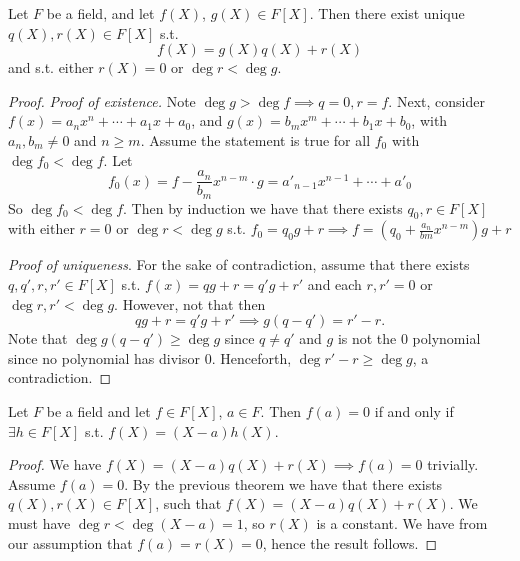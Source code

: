 \begin{theorem}
  Let $F$ be a field, and let $f(X)$, $g(X)\in F[X]$. Then there exist unique $q(X),
  r(X)\in F[X]$ s.t. 
  \[f(X)=g(X)q(X)+r(X)\]
  and s.t. either $r(X)=0$ or $\deg r < \deg g$.
  \label{thm:divisionReminderPolynomial}
\end{theorem}
\begin{proof}
  \emph{Proof of existence.} Note $\deg g> \deg f \implies q=0, r=f$. Next, consider
  $f(x)=a_nx^n+\cdots+a_1x+a_0$, and $g(x)=b_mx^m+\cdots+b_1x+b_0$, with $a_n,b_m\neq 0$
  and $n\geq m$. Assume the statement is true for all $f_0$ with $\deg f_0<\deg f$. Let 
  \[f_0(x)=f-\frac{a_n}{b_m}x^{n-m}\cdot g = a'_{n-1}x^{n-1}+\cdots+a'_0\]
  So $\deg f_0< \deg f$. Then by induction we have that there exists $q_0, r\in F[X]$ with
  either $r=0$ or $\deg r< \deg g$ s.t.  $f_0=q_0g + r \implies f=
  (q_0+\frac{a_n}{bm}x^{n-m})g + r$

  \emph{Proof of uniqueness}. For the sake of contradiction, assume that there exists
  $q,q',r,r'\in F[X]$ s.t. $f(x)=qg+r=q'g+r'$ and each $r,r'=0$ or $\deg r,r'<\deg g$.
  However, not that then 
  \[qg+r=q'g+r' \implies g(q-q')=r'-r.\]
  Note that $\deg g(q-q')\geq \deg g$ since $q\neq q'$ and $g$ is not the $0$ polynomial
  since no polynomial has divisor $0$. Henceforth, $\deg r'-r\geq \deg g$, a
  contradiction.
\end{proof}

\begin{corollary}
  Let $F$ be a field and let $f\in F[X]$, $a\in F$. Then $f(a)=0$ if and only if $\exists
  h\in F[X]$ s.t. $f(X)=(X-a)h(X)$.
  \label{<+label+>}
\end{corollary}
\begin{proof}
  We have $f(X) = (X-a)q(X)+r(X) \implies f(a)=0$ trivially. 
  Assume $f(a)=0.$ By the previous theorem we have that there exists $q(X),r(X)\in F[X]$, such that $f(X) = (X-a)q(X)+r(X)$. We must have $\deg r < \deg (X-a) = 1$, so $r(X)$ is a constant. We have from our assumption that $f(a)=r(X)=0$, hence the result follows.
\end{proof}
